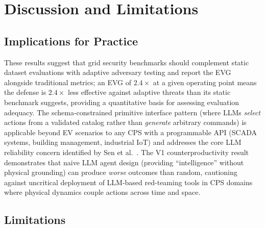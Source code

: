 \section{Discussion and Limitations}
\label{sec:discussion}

\subsection{Implications for Practice}
\label{sec:implications}

These results suggest that grid security benchmarks should complement static dataset evaluations with adaptive adversary testing and report the EVG alongside traditional metrics; an EVG of $2.4\times$ at a given operating point means the defense is $2.4\times$ less effective against adaptive threats than its static benchmark suggests, providing a quantitative basis for assessing evaluation adequacy.
%
The schema-constrained primitive interface pattern (where LLMs \emph{select} actions from a validated catalog rather than \emph{generate} arbitrary commands) is applicable beyond EV scenarios to any CPS with a programmable API (SCADA systems, building management, industrial IoT) and addresses the core LLM reliability concern identified by Sen et al.~\cite{sen2024aiattacker}.
%
The V1 counterproductivity result demonstrates that naive LLM agent design (providing ``intelligence'' without physical grounding) can produce \emph{worse} outcomes than random, cautioning against uncritical deployment of LLM-based red-teaming tools in CPS domains where physical dynamics couple actions across time and space.

\subsection{Limitations}
\label{sec:limitations}

